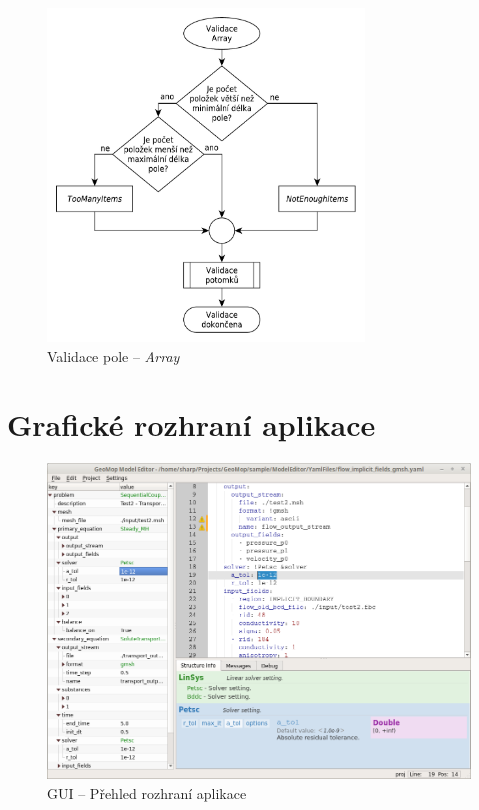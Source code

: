\documentclass[FM,bw,DP]{tulthesis}
\begin{document}
\begin{figure}[h]
	\centering
    \includegraphics[width=0.75\textwidth]{../img/validation_array.pdf}
    \caption{Validace pole -- \textit{Array}}
	\label{img:validation_array}
\end{figure}



\chapter{Grafické rozhraní aplikace}
\label{apx:gui}

\begin{figure}[h]
	\centering
    \includegraphics[width=\textwidth]{../img/screenshots/gui_overview.png}
    \caption{GUI -- Přehled rozhraní aplikace}
	\label{img:gui_overview}
\end{figure}
\end{document}
